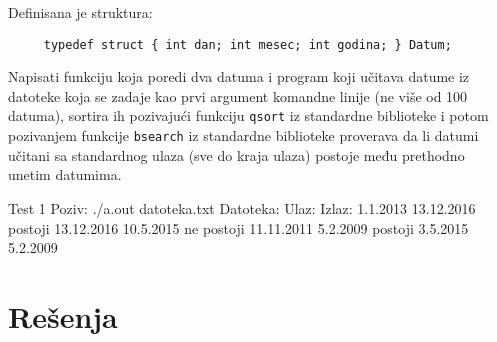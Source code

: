 \begin{Exercise}[label=516]
Definisana je struktura:
\begin{verbatim}
     typedef struct { int dan; int mesec; int godina; } Datum;
\end{verbatim}

Napisati funkciju koja poredi dva datuma i program koji učitava datume
iz datoteke koja se zadaje kao prvi argument komandne linije (ne više
od 100 datuma), sortira ih pozivajući funkciju \verb|qsort| iz
standardne biblioteke i potom pozivanjem funkcije \verb|bsearch| iz
standardne biblioteke proverava da li datumi učitani sa standardnog
ulaza (sve do kraja ulaza) postoje među prethodno unetim datumima.
  
\begin{maxitest}
\begin{test}{Test 1}
Poziv: ./a.out datoteka.txt
Datoteka:            Ulaz:             Izlaz:
1.1.2013             13.12.2016        postoji
13.12.2016           10.5.2015         ne postoji
11.11.2011           5.2.2009          postoji
3.5.2015
5.2.2009
\end{test}
\end{maxitest}
  
\end{Exercise}




\section{Rešenja}
\shipoutAnswer


